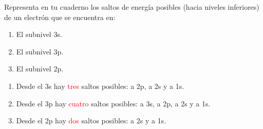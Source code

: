 \begin{exercise}
    Representa en tu cuaderno los saltos de energía posibles (hacia niveles inferiores) de un electrón que se encuentra en:
    \begin{enumerate}[label=\alph*)]
        \item El subnivel 3s.
        \item El subnivel 3p.
        \item El subnivel 2p.
    \end{enumerate}
    \begin{solu}
        \begin{enumerate}[label=\alph*)]
            \item Desde el 3s hay \textcolor{red}{tres} saltos posibles: a 2p, a 2s y a 1s.
            \item Desde el 3p hay \textcolor{red}{cuatro} saltos posibles: a 3s, a 2p, a 2s y a 1s.
            \item Desde el 2p hay \textcolor{red}{dos} saltos posibles: a 2s y a 1s.
        \end{enumerate}
    \end{solu}
\end{exercise}

